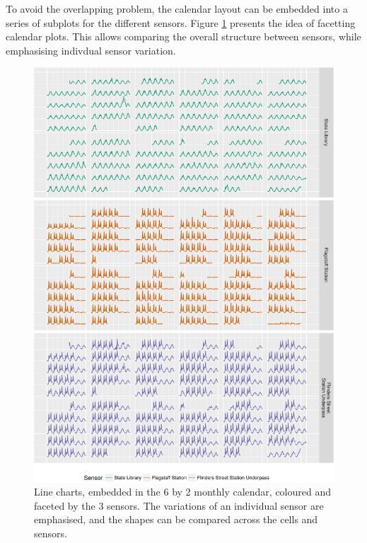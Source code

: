\documentclass[article]{jss}
\begin{document}
To avoid the overlapping problem, the calendar layout can be embedded
into a series of subplots for the different sensors. Figure
\ref{fig:facet} presents the idea of facetting calendar plots. This
allows comparing the overall structure between sensors, while
emphasising indivdual sensor variation.

\begin{CodeChunk}
\begin{figure}

{\centering \includegraphics[width=\textwidth]{figure/facet-1} 

}

\caption[Line charts, embedded in the 6 by 2 monthly calendar, coloured and faceted by the 3 sensors]{Line charts, embedded in the 6 by 2 monthly calendar, coloured and faceted by the 3 sensors. The variations of an individual sensor are emphasised, and the shapes can be compared across the cells and sensors.}\label{fig:facet}
\end{figure}
\end{CodeChunk}
\end{document}
